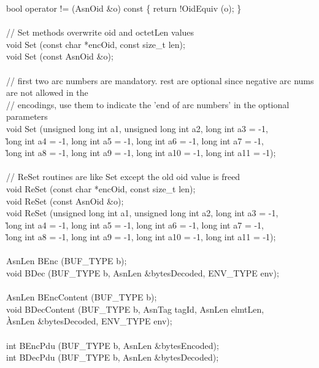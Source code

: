 \begin{Ccode}
  bool				\>\>operator != (AsnOid \&o) const \{ return !OidEquiv (o); \}\\
\\
  // Set methods overwrite oid and octetLen values\\
  void				\>\>Set (const char *encOid, const size\_t len);\\
  void				\>\>Set (const AsnOid \&o);\\
\\
  // first two arc numbers are mandatory.  rest are optional since negative arc nums are not allowed in the\\
  // encodings, use them to indicate the 'end of arc numbers' in the optional parameters\\
  void				\>\>Set (unsigned long int a1, unsigned long int a2, long int a3 = -1,\\
					\`long int a4 = -1, long int a5 = -1, long int a6 = -1, long int a7 = -1,\\
					\`long int a8 = -1, long int a9 = -1, long int a10 = -1, long int a11 = -1);\\
\\
  // ReSet routines are like Set except the old oid value is freed\\
  void				\>\>ReSet (const char *encOid, const size\_t len);\\
  void				\>\>ReSet (const AsnOid \&o);\\
  void				\>\>ReSet (unsigned long int a1, unsigned long int a2, long int a3 = -1,\\
					\`long int a4 = -1, long int a5 = -1, long int a6 = -1, long int a7 = -1,\\
					\`long int a8 = -1, long int a9 = -1, long int a10 = -1, long int a11 = -1);\\
\\
  AsnLen			\>\>BEnc (BUF\_TYPE b);\\
  void				\>\>BDec (BUF\_TYPE b, AsnLen \&bytesDecoded, ENV\_TYPE env);\\
\\
  AsnLen			\>\>BEncContent (BUF\_TYPE b);\\
  void				\>\>BDecContent (BUF\_TYPE b, AsnTag tagId, AsnLen elmtLen,\\
					\`AsnLen \&bytesDecoded, ENV\_TYPE env);\\
\\
  int				\>\>BEncPdu (BUF\_TYPE b, AsnLen \&bytesEncoded);\\
  int				\>\>BDecPdu (BUF\_TYPE b, AsnLen \&bytesDecoded);\\

\end{Ccode}
